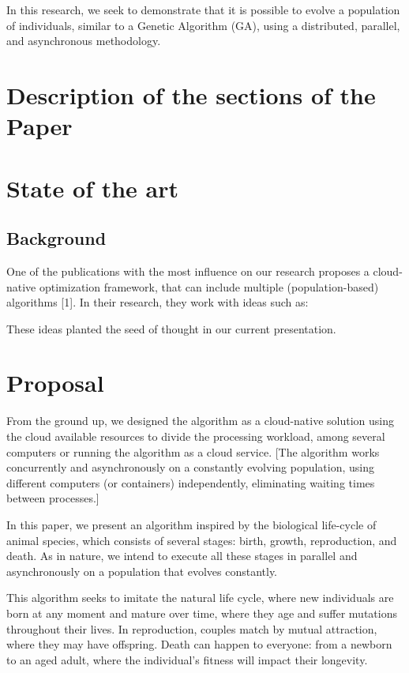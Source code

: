\documentclass[runningheads]{llncs}
\begin{document}
In this research, we seek to demonstrate that it is possible to evolve a
population of individuals, similar to a Genetic Algorithm (GA), using a
distributed, parallel, and asynchronous methodology.



\section{Description of the sections of the Paper} 

\section{State of the art} 

\subsection{Background}

One of the publications with the most influence on our research proposes a
cloud-native optimization framework, that can include multiple
(population-based) algorithms [1]. In their research, they work with ideas such
as:


These ideas planted the seed of thought in our current presentation.

\section{Proposal} 

From the ground up, we designed the algorithm as a cloud-native solution using
the cloud available resources to divide the processing workload, among several
computers or running the algorithm as a cloud service. [The algorithm works
concurrently and asynchronously on a constantly evolving population, using
different computers (or containers) independently, eliminating waiting times
between processes.]

In this paper, we present an algorithm inspired by the biological life-cycle of
animal species, which consists of several stages: birth, growth, reproduction,
and death. As in nature, we intend to execute all these stages in parallel and
asynchronously on a population that evolves constantly.

This algorithm seeks to imitate the natural life cycle, where new individuals
are born at any moment and mature over time, where they age and suffer
mutations throughout their lives. In reproduction, couples match by mutual
attraction, where they may have offspring. Death can happen to everyone: from a
newborn to an aged adult, where the individual's fitness will impact their
longevity.
\end{document}
